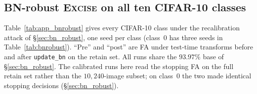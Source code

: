\documentclass{article}
\newcommand{\ours}{\textsc{Excise}}
\theoremstyle{remark}
\theoremstyle{plain}
\begin{document}
\begingroup\color{revised}%
\subsection{BN-robust \ours{} on all ten CIFAR-10 classes}\label{app:bnrobust_perclass}

Table~\ref{tab:app_bnrobust} gives every CIFAR-10 class under the recalibration
attack of \S\ref{sec:bn_robust}, one seed per class (class~0 has three seeds in
Table~\ref{tab:bnrobust}). ``Pre'' and ``post'' are FA under test-time transforms
before and after \texttt{update\_bn} on the retain set. All runs share the
$93.97\%$ base of \S\ref{sec:bn_robust}. The calibrated runs here read the
stopping FA on the full retain set rather than the $10{,}240$-image subset; on
class~0 the two made identical stopping decisions (\S\ref{sec:bn_robust}).
\end{document}
